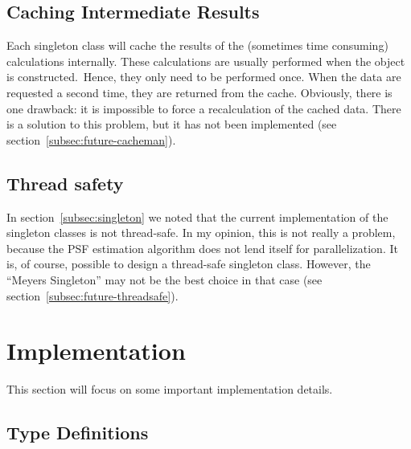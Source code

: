 \documentclass[a4paper]{article}
\begin{document}
\subsection{Caching Intermediate Results}
\label{subsec:caching}
Each singleton class will cache the results of the (sometimes time consuming)
calculations internally. These calculations are usually performed when the
object is constructed.\footnotemark\ Hence, they only need to be performed
once. When the data are requested a second time, they are returned from the
cache. Obviously, there is one drawback: it is impossible to force a
recalculation of the cached data. There is a solution to this problem, but it
has not been implemented (see section~\ref{subsec:future-cacheman}).



\subsection{Thread safety}
\label{subsec:thread_safety}
In section~\ref{subsec:singleton} we noted that the current implementation of
the singleton classes is not thread-safe. In my opinion, this is not really a
problem, because the PSF estimation algorithm does not lend itself for
parallelization. It is, of course, possible to design a thread-safe singleton
class. However, the ``Meyers Singleton'' may not be the best choice in that
case (see section~\ref{subsec:future-threadsafe}).



\section{Implementation}
\label{sec:implementation}
This section will focus on some important implementation details. 


\subsection{Type Definitions}
\end{document}
